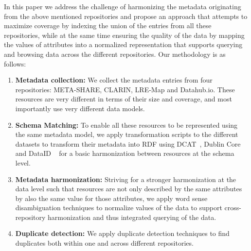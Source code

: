 \documentclass[11pt]{article}
\begin{document}
In this paper we address the challenge of harmonizing the metadata originating from the above mentioned repositories and propose an approach that attempts to maximize coverage by indexing the union of the entries from all these repositories, while at the same time ensuring the quality of the data by mapping the values of attributes into a normalized representation that supports querying and browsing data across the different repositories. Our methodology is as follows:

\begin{enumerate}
\item \textbf{Metadata collection:} We collect the metadata entries from four repositories: META-SHARE, CLARIN, LRE-Map and Datahub.io. These resources are very
different in terms of their size and coverage, and most importantly use very
different data models.
\item \textbf{Schema Matching:} To enable all these resources to be represented using the same metadata
model, we apply transformation scripts to the different datasets to transform their metadata into RDF using DCAT~\cite{maali2014data}, Dublin Core~\cite{weibel1998dublin} and DataID ~\cite{brummer2014dataid} for a basic harmonization between resources at the schema level. 
\item \textbf{Metadata harmonization:} Striving for a stronger harmonization at
    the data level such that resources are not only described by the same
    attributes by also the same value for those attributes, we apply word sense
    disambiguation techniques to normalize values of the data to support
    cross-repository harmonization and thus integrated querying of the data.%
\item \textbf{Duplicate detection:} We apply duplicate detection techniques to find duplicates both within one and across different repositories.
\end{enumerate}

\end{document}
